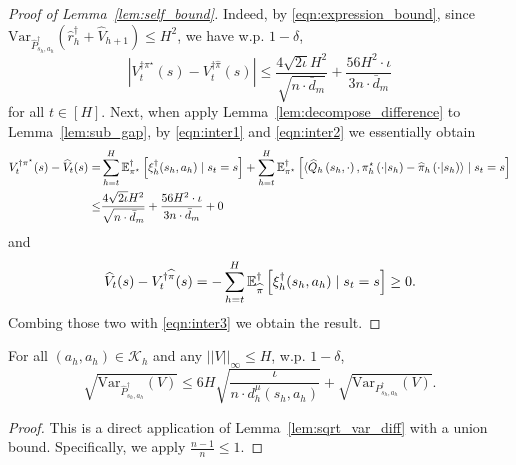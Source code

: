 \begin{proof}[Proof of Lemma~\ref{lem:self_bound}]
	Indeed, by \eqref{eqn:expression_bound}, since $\mathrm{Var}_{\widehat{P}^\dagger_{s_h,a_h}}(\widehat{r}^\dagger_h+\widehat{V}_{h+1})\leq H^2$, we have w.p. $1-\delta$,
	\begin{equation}\label{eqn:inter3}
	\left|V_t^{\dagger\pi^\star}(s)-V_t^{\dagger\widehat{\pi}}(s)\right|\leq \frac{4\sqrt{2\iota}H^2}{\sqrt{n\cdot\bar{d}_m}} +\frac{56H^2\cdot \iota}{3n\cdot \bar{d}_m}
	\end{equation}
	for all $t\in[H]$. Next, when apply Lemma~\ref{lem:decompose_difference} to Lemma~\ref{lem:sub_gap}, by \eqref{eqn:inter1} and \eqref{eqn:inter2} we essentially obtain
	\begin{align*}
	V_t^{\dagger\pi^\star}(s)-\widehat{V}_t(s)=&\sum_{h=t}^H\mathbb{E}^\dagger_{\pi^\star}\left[\xi^\dagger_h(s_h,a_h)\mid s_t=s\right]
	+\sum_{h=t}^{H} \mathbb{E}^\dagger_{\pi^\star}\left[\langle\widehat{Q}_{h}\left(s_{h}, \cdot\right), \pi^\star_{h}\left(\cdot | s_{h}\right)-\widehat{\pi}_{h}\left(\cdot | s_{h}\right)\rangle \mid s_{t}=s\right]\\
	\leq&\frac{4\sqrt{2\iota}H^2}{\sqrt{n\cdot\bar{d}_m}} +\frac{56H^2\cdot \iota}{3n\cdot \bar{d}_m}+0
	\end{align*}
	and
	\[
	\widehat{V}_t(s)-V_t^{\dagger\widehat{\pi}}(s)=-\sum_{h=t}^H\mathbb{E}^\dagger_{\widehat{\pi}}\left[\xi^\dagger_h(s_h,a_h)\mid s_t=s\right]\geq 0.
	\]
	Combing those two with \eqref{eqn:inter3} we obtain the result.

	
\end{proof}




\begin{lemma}\label{lem:var_change}
	For all $(a_h,a_h)\in\mathcal{K}_h$ and any $||V||_\infty\leq H$, w.p. $1-\delta$,
	\[
	\sqrt{\mathrm{Var}_{\widehat{P}^\dagger_{s_h,a_h}}(V)}\leq 6H \sqrt{\frac{\iota}{n\cdot d^\mu_h(s_h,a_h)}}+\sqrt{\mathrm{Var}_{{P}^\dagger_{s_h,a_h}}(V)}.
	\] 
\end{lemma}
\begin{proof}
	
	
	This is a direct application of Lemma~\ref{lem:sqrt_var_diff} with a union bound. Specifically, we apply $\frac{n-1}{n}\leq 1$.
	
\end{proof}

